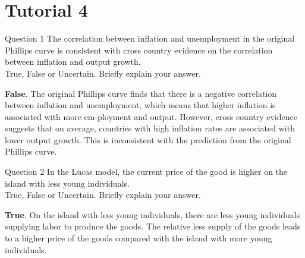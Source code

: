 \documentclass[a4paper]{article}
\newif\IfInSansMode
\numberwithin{equation}{section}
\numberwithin{figure}{section}
\begin{document}
\section{Tutorial 4}
	\begin{questionbox}{Question 1}
		The correlation between inflation and unemployment in the original Phillips curve is consistent with cross country evidence on the correlation between inflation and output growth.\\
		True, False or Uncertain. Briefly explain your answer.
		\begin{explanationbox}
			\textbf{False}. The original Phillips curve finds that there is a negative correlation between inflation and unemployment, which means that higher inflation is associated with more em-ployment and output. However, cross country evidence suggests that on average, countries with high inflation rates are associated with lower output growth. This is inconsistent with the prediction from the original Phillips curve.
		\end{explanationbox}
	\end{questionbox}
	\begin{questionbox}{Question 2}
		In the Lucas model, the current price of the good is higher on the island with less young individuals.\\
		True, False or Uncertain. Briefly explain your answer.
		\begin{explanationbox}
			\textbf{True}. On the island with less young individuals, there are less young individuals supplying labor to produce the goods. The relative less supply of the goods leads to a higher price of the goods compared with the island with more young individuals.
		\end{explanationbox}
	\end{questionbox}
\end{document}

